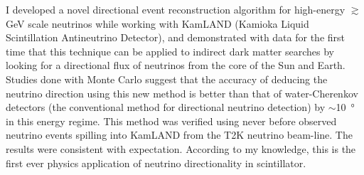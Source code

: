 \documentclass[10pt]{article} %
\begin{document}
%
%





I developed a novel directional event reconstruction algorithm for high-energy
$\gtrsim$\si{\giga\electronvolt} scale neutrinos while working with KamLAND
(Kamioka Liquid Scintillation Antineutrino Detector), and demonstrated with
data for the first time that this technique can be applied to indirect dark
matter searches by looking for a directional flux of neutrinos from the core of
the Sun and Earth. Studies done with Monte Carlo suggest that the accuracy of
deducing the neutrino direction using this new method is better than that of
water-Cherenkov detectors (the conventional method for directional neutrino
detection) by $\sim$\SI{10}{\degree} in this energy regime. This method was
verified using never before observed neutrino events spilling into KamLAND from
the T2K neutrino beam-line. The results were consistent with expectation.
According to my knowledge, this is the first ever physics application of
neutrino directionality in scintillator.
\end{document}
